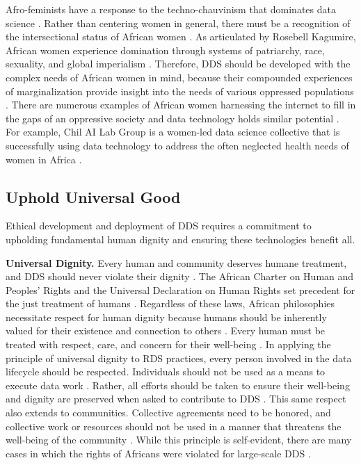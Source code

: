 Afro-feminists have a response to the techno-chauvinism that dominates data science \cite{sinha2023principlesafrofeminist}. Rather than centering women in general, there must be a recognition of the intersectional status of African women \cite{sinha2023principlesafrofeminist}. As articulated by Rosebell Kagumire, African women experience domination through systems of patriarchy, race, sexuality, and global imperialism \cite{dieng2023speaking, coetzee2004particularity}. Therefore, DDS should be developed with the complex needs of African women in mind, because their compounded experiences of marginalization provide insight into the needs of various oppressed populations \cite{sinha2023principlesafrofeminist}. 
There are numerous examples of African women harnessing the internet to fill in the gaps of an oppressive society and data technology holds similar potential \cite{dieng2023speaking}.
For example, Chil AI Lab Group is a women-led data science collective that is successfully using data technology to address the often neglected health needs of women in Africa \cite{eke2023towards}. 

\subsection{Uphold Universal Good}
Ethical development and deployment of DDS requires a commitment to upholding fundamental human dignity and ensuring these technologies benefit all. 

\textbf{Universal Dignity.}
Every human and community deserves humane treatment, and DDS should never violate their dignity \cite{olojede2023towards,mhlambi2020from}. The African Charter on Human and Peoples’ Rights and the Universal Declaration on Human Rights set precedent for the just treatment of humans \cite{african_union2024continental}. Regardless of these laws, African philosophies necessitate respect for human dignity because humans should be inherently valued for their existence and connection to others \cite{segun2021critically,metz2021african, dignum2023responsible}. Every human must be treated with respect, care, and concern for their well-being \cite{wiredu2004akan,dieng2023speaking,coetzee2004particularity, gyekye2004person, wiredu2004moralfoundations}. 
In applying the principle of universal dignity to RDS practices, every person involved in the data lifecycle should be respected.
Individuals should not be used as a means to execute data work \cite{metz2021african,ramose2004struggle}. Rather, all efforts should be taken to ensure their well-being and dignity are 
preserved when asked to contribute to DDS \cite{gwagwa2019recommendations,abebe2021narratives}. This same respect also extends to communities. Collective agreements need to be honored, and collective work or resources should not be used in a manner that threatens the well-being of the community \cite{moahi2007globalization}. While this principle is self-evident, there are many cases in which the rights of Africans were violated for large-scale DDS
\cite{african_union2024continental, segun2021critically, kohnert2022machine, moahi2007globalization}.

